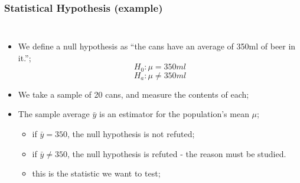 \documentclass[10pt]{beamer}
\begin{document}
\begin{frame}
  \frametitle{Statistical Hypothesis (example)}
    \begin{columns}[c]
      \begin{itemize}
      \item We define a null hypothesis as ``the cans have an
        average of 350ml of beer in it.'';
        \begin{equation*}
          H_0 : \mu = 350ml
        \end{equation*}
        \begin{equation*}
          H_a : \mu \neq 350ml
        \end{equation*}
      \item We take a sample of 20 cans, and measure the contents of each;
      \item The sample average $\bar{y}$ is an estimator for the
        population's mean $\mu$;
        \begin{itemize}
          \item if $\bar{y} = 350$, the null hypothesis is not refuted;
          \item if $\bar{y} \neq 350$, the null hypothesis is refuted
            - the reason must be studied.
          \item this is the statistic we want to test;
        \end{itemize}
      \end{itemize}

\end{columns}
\end{frame}
\end{document}
